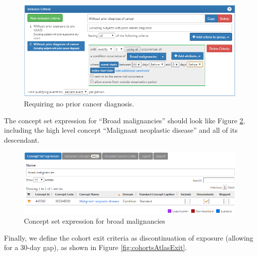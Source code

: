 \documentclass[11pt]{book}
\theoremstyle{definition}
\theoremstyle{definition}
\theoremstyle{definition}
\theoremstyle{remark}
\begin{document}
\begin{figure}

{\centering \includegraphics[width=1\linewidth]{images/SuggestedAnswers/cohortsAtlasInclusion2} 

}

\caption{Requiring no prior cancer diagnosis.}\label{fig:cohortsAtlasInclusion2}
\end{figure}

The concept set expression for ``Broad malignancies'' should look like Figure \ref{fig:cohortsAtlasConceptSet3}, including the high level concept ``Malignant neoplastic disease'' and all of its descendant.

\begin{figure}

{\centering \includegraphics[width=1\linewidth]{images/SuggestedAnswers/cohortsAtlasConceptSet3} 

}

\caption{Concept set expression for broad malignancies}\label{fig:cohortsAtlasConceptSet3}
\end{figure}

Finally, we define the cohort exit criteria as discontinuation of exposure (allowing for a 30-day gap), as shown in Figure \ref{fig:cohortsAtlasExit}.
\end{document}
